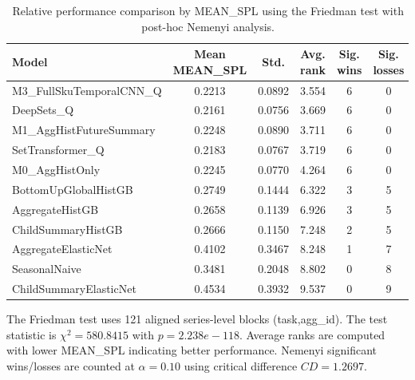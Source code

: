 \begin{table}[H]
\centering
\caption{Relative performance comparison by MEAN_SPL using the Friedman test with post-hoc Nemenyi analysis.}
\label{tab:stats_mean_spl}
\begin{threeparttable}
\begin{tabular}{lccccc}
\toprule
Model & Mean MEAN_SPL & Std. & Avg. rank & Sig. wins & Sig. losses \\
\midrule
M3\_FullSkuTemporalCNN\_Q & 0.2213 & 0.0892 & 3.554 & 6 & 0 \\
DeepSets\_Q & 0.2161 & 0.0756 & 3.669 & 6 & 0 \\
M1\_AggHistFutureSummary & 0.2248 & 0.0890 & 3.711 & 6 & 0 \\
SetTransformer\_Q & 0.2183 & 0.0767 & 3.719 & 6 & 0 \\
M0\_AggHistOnly & 0.2245 & 0.0770 & 4.264 & 6 & 0 \\
BottomUpGlobalHistGB & 0.2749 & 0.1444 & 6.322 & 3 & 5 \\
AggregateHistGB & 0.2658 & 0.1139 & 6.926 & 3 & 5 \\
ChildSummaryHistGB & 0.2666 & 0.1150 & 7.248 & 2 & 5 \\
AggregateElasticNet & 0.4102 & 0.3467 & 8.248 & 1 & 7 \\
SeasonalNaive & 0.3481 & 0.2048 & 8.802 & 0 & 8 \\
ChildSummaryElasticNet & 0.4534 & 0.3932 & 9.537 & 0 & 9 \\
\bottomrule
\end{tabular}
\begin{tablenotes}
\footnotesize \item The Friedman test uses 121 aligned series-level blocks (task,agg\_id). The test statistic is $\chi^2=580.8415$ with $p=2.238e-118$. Average ranks are computed with lower MEAN_SPL indicating better performance. Nemenyi significant wins/losses are counted at $\alpha=0.10$ using critical difference $CD=1.2697$.
\end{tablenotes}
\end{threeparttable}
\end{table}

